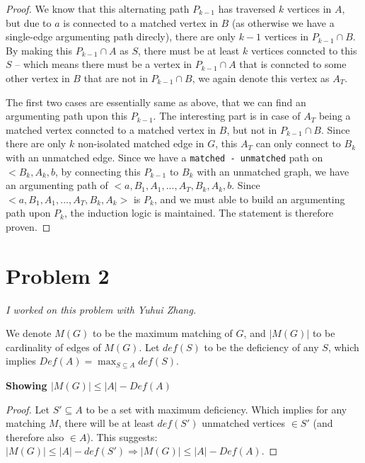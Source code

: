 \documentclass[11pt]{article}
\newcommand{\ilc}{\texttt}
\begin{document}
\begin{proof}
We know that this alternating path $P_{k-1}$ has traversed $k$ vertices in $A$, but due to $a$ is connected to a matched vertex in $B$ (as otherwise we have a single-edge argumenting path direcly), there are only $k-1$ vertices in $P_{k-1} \cap B$. By making this $P_{k-1} \cap A$ as $S$, there must be at least $k$ vertices conncted to this $S$ -- which means there must be a vertex in $P_{k-1} \cap A$ that is conncted to some other vertex in $B$ that are not in $P_{k-1} \cap B$, we again denote this vertex as $A_T$.

The first two cases are essentially same as above, that we can find an argumenting path upon this $P_{k-1}$. The interesting part is in case of $A_T$ being a matched vertex conncted to a matched vertex in $B$, but not in $P_{k-1} \cap B$. Since there are only $k$ non-isolated matched edge in $G$, this $A_T$ can only connect to $B_k$ with an unmatched edge. Since we have a \ilc{matched - unmatched} path on $<B_k, A_k, b$, by connecting this $P_{k-1}$ to $B_k$ with an unmatched graph, we have an argumenting path of $<a, B_1, A_1, ..., A_T, B_k, A_k, b$. Since $<a, B_1, A_1, ..., A_T, B_k, A_k>$ is $P_k$, and we must able to build an argumenting path upon $P_k$, the induction logic is maintained. The statement is therefore proven.


\end{proof}


\section{Problem 2}

\textit{I worked on this problem with Yuhui Zhang.\newline}



We denote $M(G)$ to be the maximum matching of $G$, and $|M(G)|$ to be cardinality of edges of $M(G)$. Let $def(S)$ to be the deficiency of any $S$, which implies $Def(A) = \max_{S \subseteq A} def(S)$.\newline


\textbf{Showing $|M(G)| \leq |A| - Def(A)$}
\begin{proof}
Let $S' \subseteq A$ to be a set with maximum deficiency. Which implies for any matching $M$, there will be at least $def(S')$ unmatched vertices $\in S'$ (and therefore also $\in A$). This suggests: $|M(G)| \leq |A| - def(S') \Longrightarrow |M(G)| \leq |A| - Def(A)$.

\end{proof}
\end{document}
